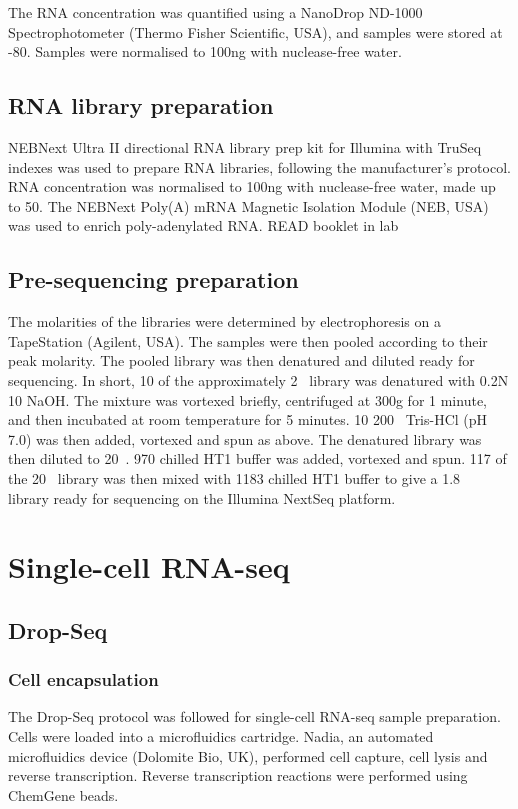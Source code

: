 The RNA concentration was quantified using a NanoDrop ND-1000 Spectrophotometer (Thermo Fisher Scientific, USA), and samples were stored at -80\C{}.
Samples were normalised to 100\si{\ng} with nuclease-free water.


\subsection{RNA library preparation}
NEBNext\textsuperscript{\textregistered} Ultra II directional RNA library prep kit for Illumina\textsuperscript{\textregistered} with TruSeq indexes was used to prepare RNA libraries, following the manufacturer's protocol.
RNA concentration was normalised to 100\si{\ng} with nuclease-free water, made up to 50\ul{}.
The NEBNext Poly(A) mRNA Magnetic Isolation Module (NEB, USA) was used to enrich poly-adenylated RNA. READ booklet in lab


\subsection{Pre-sequencing preparation}\label{subsec:preseq}
The molarities of the libraries were determined by electrophoresis on a TapeStation (Agilent, USA).
The samples were then pooled according to their peak molarity.
The pooled library was then denatured and diluted ready for sequencing.
In short, 10\ul{} of the approximately 2\si{\nano\Molar} library was denatured with 0.2N 10\ul{} NaOH.
The mixture was vortexed briefly, centrifuged at 300g for 1 minute, and then incubated at room temperature for 5 minutes.
10\ul{} 200\si{\milli\Molar} Tris-HCl (pH 7.0) was then added, vortexed and spun as above.
The denatured library was then diluted to 20\si{\pico\Molar}.
970\ul{} chilled HT1 buffer was added, vortexed and spun.
117\ul{} of the 20\si{\pico\Molar} library was then mixed with 1183\ul{} chilled HT1 buffer to give a 1.8\si{\pico\Molar} library ready for sequencing on the Illumina NextSeq platform.

\section{Single-cell RNA-seq}
\subsection{Drop-Seq}

\subsubsection{Cell encapsulation}
The Drop-Seq protocol\cite{macosko2015highly} was followed for single-cell RNA-seq sample preparation.
Cells were loaded into a microfluidics cartridge.
Nadia, an automated microfluidics device (Dolomite Bio, UK), performed cell capture, cell lysis and reverse transcription.
Reverse transcription reactions were performed using ChemGene beads.

